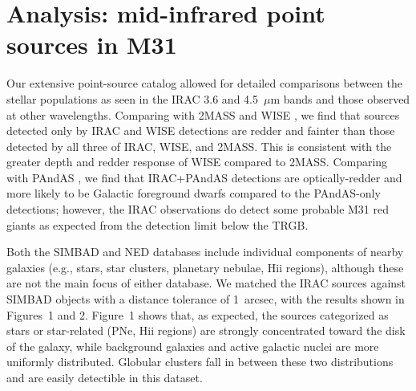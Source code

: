 \documentclass{iau}
\begin{document}
\section{Analysis: mid-infrared point sources in M31} 

Our extensive point-source catalog allowed for detailed comparisons between the stellar populations as seen in the IRAC
3.6 and 4.5~$\mu$m bands and those observed at other wavelengths. Comparing with 2MASS and WISE  \cite[(Rafiei Ravandi \etal\ 2016, Fig.\ 6)]{rr16}, 
we find that sources detected only by IRAC and WISE detections are redder and fainter than those detected by 
all three of IRAC, WISE, and 2MASS. This is consistent with the greater depth and redder response of WISE compared to 2MASS.
Comparing with PAndAS \cite[(Rafiei Ravandi \etal\ 2016, Fig.\ 7)]{rr16}, we find that IRAC+PAndAS detections are optically-redder and more likely to be
Galactic foreground  dwarfs compared to the PAndAS-only detections; however, the IRAC observations do detect some probable M31 red giants
as expected from the detection limit below the TRGB.

Both the SIMBAD and NED databases include individual components of nearby galaxies (e.g., stars, star clusters, planetary nebulae, H{\sc ii} regions),
although these are not the main focus of either database. We matched the IRAC sources against SIMBAD objects with a
distance tolerance of 1~arcsec, with the results shown in Figures~1 and 2.
Figure~1 shows that, as expected, the sources
categorized as stars or star-related (PNe, H{\sc ii} regions) are strongly concentrated toward the disk of the galaxy, while background
galaxies and active galactic nuclei are more uniformly distributed. Globular clusters fall in between these two distributions and
are easily detectible in this dataset.
\end{document}
